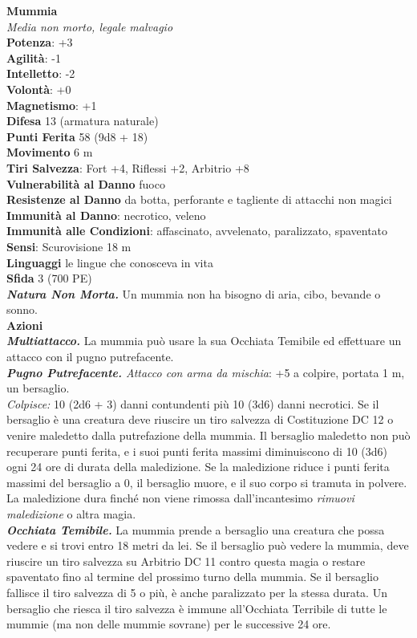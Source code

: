 \begin{multicols}{2}
\medskip\textbf{Mummia}\\
\emph{Media non morto, legale malvagio}\\
\textbf{Potenza}: +3\\
\textbf{Agilità}: -1\\
\textbf{Intelletto}: -2\\
\textbf{Volontà}: +0\\
\textbf{Magnetismo}: +1\\
\textbf{Difesa} 13 (armatura naturale)\\
\textbf{Punti Ferita} 58 (9d8 + 18)\\
\textbf{Movimento} 6 m\\
\textbf{Tiri Salvezza}: Fort +4, Riflessi +2, Arbitrio +8\\
\textbf{Vulnerabilità al Danno} fuoco\\
\textbf{Resistenze al Danno} da botta, perforante e tagliente di attacchi non magici\\
\textbf{Immunità al Danno}: necrotico, veleno\\
\textbf{Immunità alle Condizioni}: affascinato, avvelenato, paralizzato, spaventato\\
\textbf{Sensi}: Scurovisione 18 m \\
\textbf{Linguaggi} le lingue che conosceva in vita\\
\textbf{Sfida} 3 (700 PE)\smallskip\\
\emph{\textbf{Natura Non Morta.}} Un mummia non ha bisogno di aria, cibo, bevande o sonno.\\
\smallskip\textbf{Azioni}\\
\emph{\textbf{Multiattacco.}} La mummia può usare la sua Occhiata Temibile ed effettuare un attacco con il pugno putrefacente.\\

\emph{\textbf{Pugno Putrefacente.} Attacco con arma da mischia}: +5 a colpire, portata 1 m, un bersaglio.\\

\emph{Colpisce:} 10 (2d6 + 3) danni contundenti più 10 (3d6) danni necrotici. Se il bersaglio è una creatura deve riuscire un tiro salvezza di Costituzione DC 12 o venire maledetto dalla putrefazione della mummia. Il bersaglio maledetto non può recuperare punti ferita, e i suoi punti ferita massimi diminuiscono di 10 (3d6) ogni 24 ore di durata della maledizione. Se la maledizione riduce i punti ferita massimi del bersaglio a 0, il bersaglio muore, e il suo corpo si tramuta in polvere. La maledizione dura finché non viene rimossa dall'incantesimo \emph{rimuovi maledizione} o altra magia.\\
\emph{\textbf{Occhiata Temibile.}} La mummia prende a bersaglio una creatura che possa vedere e si trovi entro 18 metri da lei. Se il bersaglio può vedere la mummia, deve riuscire un tiro salvezza su Arbitrio DC 11 contro questa magia o restare spaventato fino al termine del prossimo turno della mummia. Se il bersaglio fallisce il tiro salvezza di 5 o più, è anche paralizzato per la stessa durata. Un bersaglio che riesca il tiro salvezza è immune all'Occhiata Terribile di tutte le mummie (ma non delle mummie sovrane) per le successive 24 ore.\\


\end{multicols}

